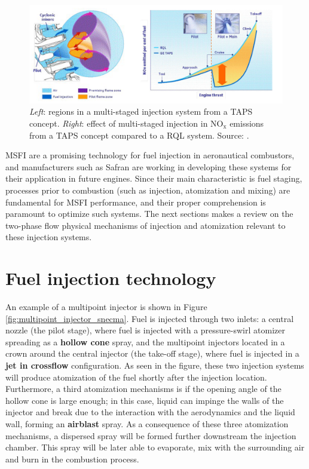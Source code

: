 \begin{figure}[h!]
	\centering
	\includegraphics[scale=0.6]{./part0_intro/foust_TAPS}
	\caption{\textsl{Left}: regions in a multi-staged injection system from a TAPS concept. \textsl{Right}: effect of multi-staged injection in NO$_\mathrm{x}$ emissions from a TAPS concept compared to a RQL system. Source: .}
	\label{fig:foust_TAPS}
\end{figure}

MSFI are a promising technology for fuel injection in aeronautical combustors, and manufacturers such as Safran are working in developing these systems for their application in future engines. Since their main characteristic is fuel staging, processes prior to combustion (such as injection, atomization and mixing) are fundamental for MSFI performance, and their proper comprehension is paramount to optimize such systems. The next sections makes a review on the two-phase flow physical mechanisms of injection and atomization relevant to these injection systems.


\section{Fuel injection technology}
\label{sec:ch1_fuel_injection_technology}

An example of a multipoint injector is shown in Figure \ref{fig:multipoint_injector_snecma}. Fuel is injected through two inlets: a central nozzle (the pilot stage), where fuel is injected with a pressure-swirl atomizer spreading as a \textbf{hollow cone} spray, and the multipoint injectors located in a crown around the central injector (the take-off stage), where fuel is injected in a \textbf{jet in crossflow} configuration. As seen in the figure, these two injection systems will produce atomization of the fuel shortly after the injection location. Furthermore, a third atomization mechanisms is if the opening angle of the hollow cone is large enough; in this case, liquid can impinge the walls of the injector and break due to the interaction with the aerodynamics and the liquid wall, forming an \textbf{airblast} spray. As a consequence of these three atomization mechanisms, a dispersed spray will be formed further downstream the injection chamber. This spray will be later able to evaporate, mix with the surrounding air and burn in the combustion process.

